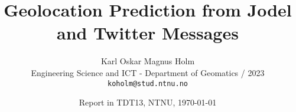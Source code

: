 \documentclass[11pt]{article}
\title{Geolocation Prediction from Jodel and Twitter Messages}
\author{Karl Oskar Magnus Holm \\
  Engineering Science and ICT - Department of Geomatics / 2023 \\
  {\tt koholm@stud.ntnu.no} \\}
\date{Report in TDT13, NTNU, \today}
\begin{document}
\maketitle


\begin{abstract}
    \begin{comment}
    This paper provides a template for writing a Project Report in TDT13, Advanced Text Analytics and Language Understanding.
    The document itself conforms to its own specifications and is thus an example of what your manuscript should look like.
    The template does not form a compulsory style that you are obliged to use, but rather provides a common starting point for all students.
    For a given report, tuning of the template may still be required, depending on the nature of the report and the author's writing style.
    Such tuning might involve moving a section to a subsection or vice versa, or removing or adding sections and subsections.

    Note that the template contains a lot of examples of how to write different parts of the report
    as well as how to cite authors and how to use LaTeX and BibTeX.
    Some of those examples might only be clear if you actually look at the LaTeX source itself.

    The abstract is your sales pitch which encourages people to read your work,
    but unlike sales it should be realistic with respect to the contributions of the work.
    It should include:
    \begin{itemize}
        \item what the research topic is,
        \item the research approach(es) applied, and
        \item contributions.
    \end{itemize}

    The abstract should not exceed 200 words.
    Do not include lists, tables or figures.
    Avoid abbreviations and references.
    \end{comment}
\end{abstract}

\glsaddall









\printbibliography

%
\end{document}
